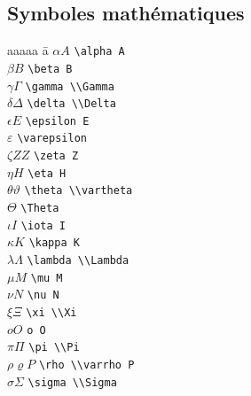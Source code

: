 \documentclass{article}
\newenvironment{tighttabbing}
  {\begingroup\setlength{\parskip}{0pt}\begin{tabbing}}
  {\end{tabbing}\endgroup}
\begin{document}
\begin{multicols*}{3}
\subsection*{Symboles mathématiques}
\begin{multicols*}{3}
    \begin{tighttabbing}
        aaaaa \= a \kill
        $\alpha A$                \> \lstinline{\alpha A} \\
        $\beta B$                 \> \lstinline{\beta B} \\
        $\gamma \Gamma$           \> \lstinline{\gamma \\Gamma} \\
        $\delta \Delta$           \> \lstinline{\delta \\Delta} \\
        $\epsilon E$  \> \lstinline{\epsilon E} \\
        $\varepsilon$ \> \lstinline{\varepsilon} \\
        $\zeta Z Z$               \> \lstinline{\zeta Z} \\
        $\eta H$                  \> \lstinline{\eta H} \\
        $\theta \vartheta$ \> \lstinline{\theta \\vartheta} \\
        $\Theta$                   \> \lstinline{\Theta} \\
        $\iota I$                 \> \lstinline{\iota I} \\
        $\kappa K$                \> \lstinline{\kappa K} \\
        $\lambda \Lambda$         \> \lstinline{\lambda \\Lambda} \\
        $\mu M$                   \> \lstinline{\mu M} \\
        $\nu N$                   \> \lstinline{\nu N} \\
        $\xi \Xi$                 \> \lstinline{\xi \\Xi} \\
        $o O$                     \> \lstinline{o O} \\
        $\pi \Pi$                 \> \lstinline{\pi \\Pi} \\
        $\rho \varrho P$          \> \lstinline{\rho \\varrho P} \\
        $\sigma \Sigma$           \> \lstinline{\sigma \\Sigma} \\

\end{tighttabbing}
\end{multicols*}
\end{multicols*}
\end{document}
